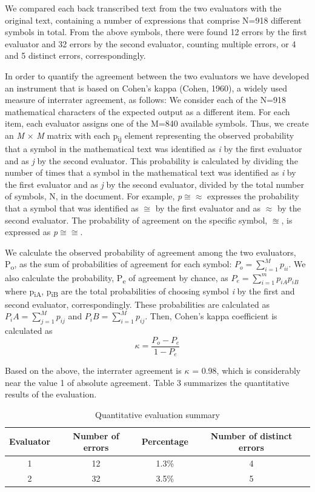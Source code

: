 \documentclass[11.5pt]{sig-alternate} %
\begin{document}
\begin{large}
We compared each back transcribed text from the two evaluators with the original text, containing a number of expressions that comprise N=918 different symbols in total. From the above symbols, there were found 12 errors by the first evaluator and 32 errors by the second evaluator, counting multiple errors, or 4 and 5 distinct errors, correspondingly.  

In order to quantify the agreement between the two evaluators we have developed an instrument that is based on Cohen’s kappa (Cohen, 1960), a widely used measure of interrater agreement, as follows: We consider each of the N=918 mathematical characters of the expected output as a different item. For each item, each evaluator assigns one of the M=840 available symbols. Thus, we create an \textit{M} × \textit{M} matrix with each p\textsubscript{ij} element representing the observed probability that a symbol in the mathematical text was identified as \textit{i} by the first evaluator and as \textit{j} by the second evaluator. This probability is calculated by dividing the number of times that a symbol in the mathematical text was identified as \textit{i} by the first evaluator and as \textit{j} by the second evaluator, divided by the total number of symbols, N, in the document. For example, \textit{p}$\cong$$\approx$ expresses the probability that a symbol that was identified as $\cong$ by the first evaluator and as $\approx$ by the second evaluator. The probability of agreement on the specific symbol, $\approxeq$, is expressed as \textit{p}$\cong$$\cong$. 

We calculate the observed probability of agreement among the two evaluators, P\textsubscript{o}, as the sum of probabilities of agreement for each symbol: $P_o = \sum_{i=1}^{M} p_{ii}$. We also calculate the probability, P\textsubscript{e} of agreement by chance, as $P_e = \sum_{i=1}^{m} p_{iA}p_{iB}$ where p\textsubscript{iA}, p\textsubscript{iB} are the total probabilities of choosing symbol \textit{i} by the first and second evaluator, correspondingly. These probabilities are calculated as $P_iA = \sum_{j=1}^{M} p_{ij}$ and $P_iB = \sum_{i=1}^{M} p_{ij}$. Then, Cohen’s kappa coefficient is calculated as \[\kappa = \frac{P_o - P_e}{1 - P_e}\]

Based on the above, the interrater agreement is $\kappa$ = 0.98, which is considerably near the value 1 of absolute agreement. Table 3 summarizes the quantitative results of the evaluation.

\begin{table}[ht]
\caption{Quantitative evaluation summary}
\begin{tabular}{cccc}
\hline
\textbf{Evaluator} & \textbf{Number of errors} & \textbf{Percentage} & \textbf{Number of distinct errors} \\ \hline
1 & 12 & 1.3\% & 4 \\ \hline
2 & 32 & 3.5\% & 5 \\ \hline
\end{tabular}
\end{table}


\end{large}
\end{document}
